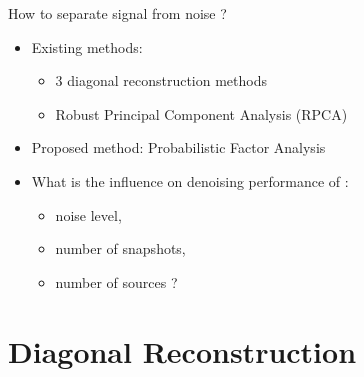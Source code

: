 \documentclass[10pt,xcolor=x11names,compress, notes=show]{beamer}%
\begin{document}
\begin{frame}{How to separate signal from noise ?}
	 
	
	\begin{itemize}
		\item Existing methods:
			\begin{itemize}
			        \item 	3 diagonal reconstruction methods
		        		\item Robust Principal Component Analysis (RPCA)
			\end{itemize}
			
		\vfill\pause
	
		\item Proposed method: Probabilistic Factor Analysis

		\vfill \pause
		\item What is the influence on denoising performance of : 
		\begin{itemize}
		        \item noise level,
		        \item number of snapshots,
		        \item number of sources ?
		\end{itemize}
	\end{itemize}
\end{frame}


\section{Diagonal Reconstruction}
\begin{frame}
\tableofcontents[hideallsubsections]
\end{frame}
\begin{frame}
\end{frame}
\end{document}
